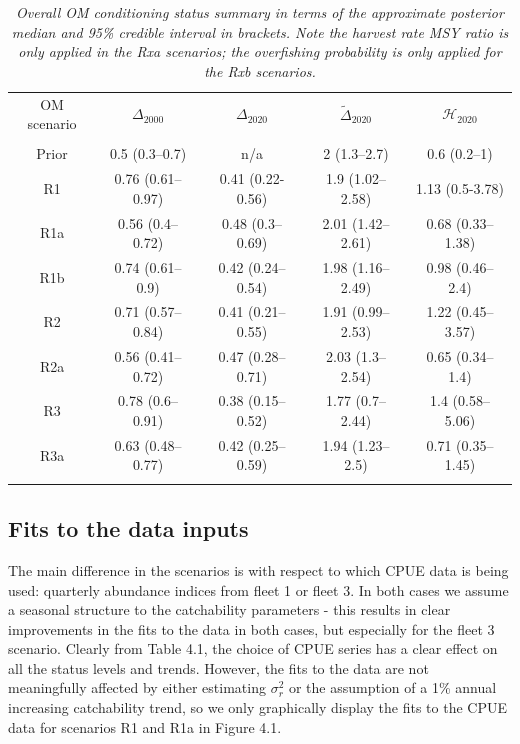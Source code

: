 \documentclass[11pt]{article}
\newcommand{\sigr}{\sigma^2_r}
\begin{document}
\begin{table}[hb]
    \begin{center}
        \begin{tabular}{|ccccc|}
            \hline
            OM scenario & $\Delta_{2000}$ & $\Delta_{2020}$ & $\tilde{\Delta}_{2020}$ & $\mathcal{H}_{2020}$\\
            & & & & \\
Prior & 0.5 (0.3–0.7)    & n/a              & 2 (1.3–2.7)      & 0.6 (0.2–1) \\
R1    & 0.76 (0.61–0.97) & 0.41 (0.22-0.56) & 1.9 (1.02–2.58)  & 1.13 (0.5-3.78) \\
R1a   & 0.56 (0.4–0.72)  & 0.48 (0.3–0.69)  & 2.01 (1.42–2.61) & 0.68 (0.33–1.38) \\
R1b   & 0.74 (0.61–0.9)  & 0.42 (0.24–0.54) & 1.98 (1.16–2.49) & 0.98 (0.46–2.4) \\
R2    & 0.71 (0.57–0.84) & 0.41 (0.21–0.55) & 1.91 (0.99–2.53) & 1.22 (0.45–3.57) \\
R2a   & 0.56 (0.41–0.72) & 0.47 (0.28–0.71) & 2.03 (1.3–2.54)  & 0.65 (0.34–1.4) \\
R3    & 0.78 (0.6–0.91)  & 0.38 (0.15–0.52) & 1.77 (0.7–2.44)  & 1.4 (0.58–5.06) \\
R3a   & 0.63 (0.48–0.77) & 0.42 (0.25–0.59) & 1.94 (1.23–2.5)  & 0.71 (0.35–1.45) \\
            & & & & \\
            \hline
        \end{tabular}
    \end{center}
    \caption{\textit{Overall OM conditioning status summary in terms of the approximate posterior median and 95\% credible interval in brackets. Note the harvest rate MSY ratio is only applied in the Rxa scenarios; the overfishing probability is only applied for the Rxb scenarios.}}
\end{table}

\subsection{Fits to the data inputs}

The main difference in the scenarios is with respect to which CPUE data is being used: quarterly abundance indices from fleet 1 or fleet 3. In both cases we assume a seasonal structure to the catchability parameters - this results in clear improvements in the fits to the data in both cases, but especially for the fleet 3 scenario. Clearly from Table 4.1, the choice of CPUE series has a clear effect on all the status levels and trends. However, the fits to the data are not meaningfully affected by either estimating $\sigr$ or the assumption of a 1\% annual increasing catchability trend,
so we only graphically display the fits to the CPUE data for scenarios R1 and R1a in Figure 4.1.
\end{document}

